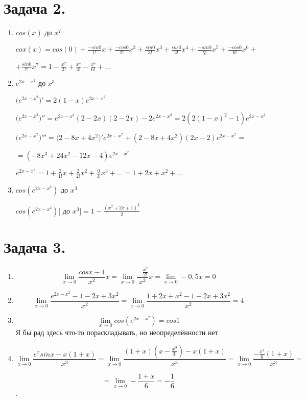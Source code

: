 \documentclass[a4paper,10pt]{article}
\begin{document}
\section{Задача 2.}
\begin{enumerate}[label=(\alph*)]
 \item $cos(x)$ до $x^7$
  
 $cox(x) = cos(0) + \frac{-sin0}{1!}x + \frac{-cos0}{2!}x^2
 + \frac{sin0}{3!}x^3 + \frac{cos0}{4!}x^4 + \frac{-sin0}{5!}x^5
 + \frac{-cos0}{6!}x^6 + $
 
 $ + \frac{sin0}{7!}x^7 = 1 - \frac{x^2}{2!} + \frac{x^4}{4!}
 - \frac{x^6}{6!} + ... $
  
 \item $e^{2x - x^{2}}$ до $x^3$
 
 $\big(e^{2x - x^{2}}\big)' = 2(1 - x)e^{2x - x^{2}}$
 
 $\big(e^{2x - x^{2}}\big)'' = e^{2x - x^{2}}(2 - 2x)
 (2 - 2x) - 2e^{2x - x^{2}} = 2(2(1-x)^2 - 1)e^{2x - x^{2}} $
 
 $\big(e^{2x - x^{2}}\big)''' = \big(2 - 8x + 4x^2\big)'
 e^{2x - x^{2}} + (2 - 8x + 4x^2)(2x - 2)e^{2x - x^{2}} = $
 
 $ = (-8x^3 + 24x^2 - 12x - 4)e^{2x - x^{2}} $
 
 $ e^{2x - x^{2}} = 1 + \frac{2}{1!}x + \frac{2}{2!}x^2 + \frac{0}{3!}x^3 + ... = 
 1 + 2x + x^2 + ... $
 
 \item $cos(e^{2x - x^{2}})$ до $x^3$
 
 $ cos(e^{2x - x^{2}}) \big[$ до $x^3\big] = 1 - \frac{(x^2 + 2x + 1)^2}{2} $ 
\end{enumerate}

\section{Задача 3.}
\begin{enumerate}[label=(\alph*)]
 \item
 $$\lim_{x \to 0} \frac{cosx - 1}{x^2}x = \lim_{x \to 0} \frac{-\frac{x^2}{2!}}{x^2}x
 = \lim_{x \to 0}-0,5x = 0 $$
 \item
 $$ \lim_{x \to 0} \frac{e^{2x - x^{2}}-1-2x+3x^2}{x^2} = \lim_{x \to 0} \frac{1 + 2x + x^2 - 1 - 2x + 3x^2}{x^2}  = 4 $$
 
 \item
 $$ \lim_{x \to 0} cos(e^{2x - x^{2}}) = cos1 $$ Я бы рад здесь что-то пораскладывать, но неопределённости нет
 
 \item
 $$ \lim_{x \to 0} \frac{e^xsinx - x(1+x)}{x^3} = \lim_{x \to 0}
 \frac{(1+x)(x-\frac{x^3}{3!}) - x(1+x)}{x^3}
 = \lim_{x \to 0} \frac{-\frac{x^3}{6} (1+x)}{x^3} = $$
 
 $$ = \lim_{x \to 0} -\frac{1+x}{6} = -\frac{1}{6}$$.
\end{enumerate}
\end{document}
